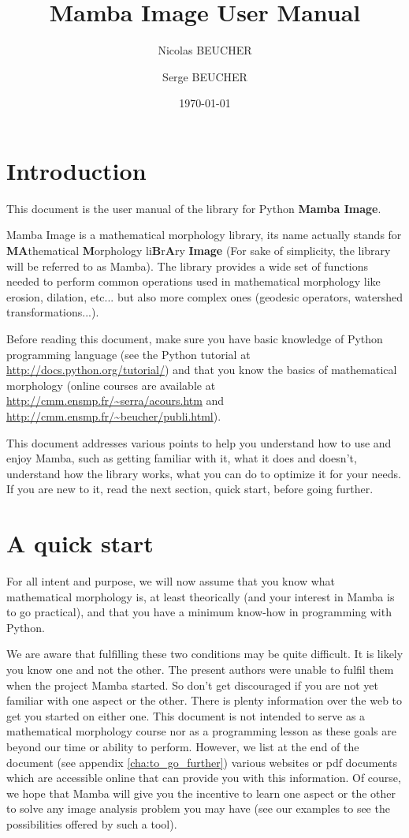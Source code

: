 \documentclass[a4paper,10pt,oneside]{article}
\title{Mamba Image User Manual}
\author{Nicolas BEUCHER \and Serge BEUCHER}
\date{\today}
\begin{document}
\mambaCover
\mambaContent

\section{Introduction}

This document is the user manual of the library for Python \textbf{Mamba Image}.

Mamba Image is a mathematical morphology library, its name actually stands for 
\textbf{MA}thematical \textbf{M}orphology li\textbf{B}r\textbf{A}ry \textbf{Image} 
(For sake of simplicity, the library will be referred to as Mamba). The library 
provides a wide set of functions needed to perform common operations used in 
mathematical morphology like erosion, dilation, etc... but also more complex ones
(geodesic operators, watershed transformations...).

Before reading this document, make sure you have basic knowledge of Python
programming language (see the Python tutorial at 
\url{http://docs.python.org/tutorial/}) and that you know the basics of 
mathematical morphology (online courses are available at 
\url{http://cmm.ensmp.fr/~serra/acours.htm} and \url{http://cmm.ensmp.fr/~beucher/publi.html}).

This document addresses various points to help you understand how to use and
enjoy Mamba, such as getting familiar with it, what it does and doesn't,
understand how the library works, what you can do to optimize it for your
needs. If you are new to it, read the next section, quick start, before going
further.

\pagebreak

\section{A quick start}

For all intent and purpose, we will now assume that you know what mathematical
morphology is, at least theorically (and your interest in Mamba is to go 
practical), and that you have a minimum know-how in programming with Python.

We are aware that fulfilling these two conditions may be quite difficult. It is 
likely you know one and not the other. The present authors were unable to 
fulfil them when the project Mamba started. So don't get discouraged if you are
not yet familiar with one aspect or the other. There is plenty information over
the web to get you started on either one. This document is not intended to serve
as a mathematical morphology course nor as a programming lesson as these goals are
beyond our time or ability to perform. However, we list at the end of the
document (see appendix \ref{cha:to_go_further}) various websites or pdf documents which are 
accessible online that can provide you with this information. Of course, we hope that
Mamba will give you the incentive to learn one aspect or the other to solve
any image analysis problem you may have (see our examples to see the 
possibilities offered by such a tool).
\end{document}
